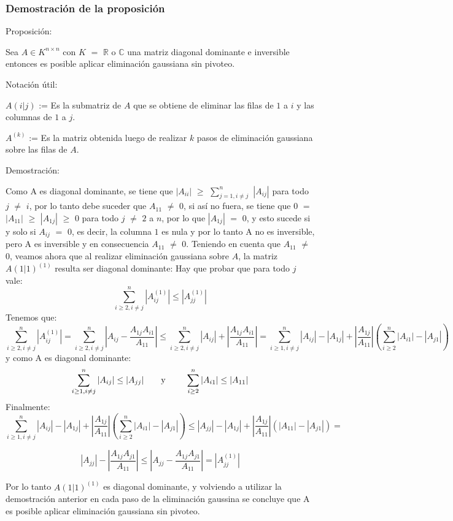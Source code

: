 \subsubsection{Demostración de la proposición}
Proposición:

Sea $A \in K^{n \times n}$ con $K$ $=$ $\mathbb{R}$ o $\mathbb{C}$ una matriz diagonal dominante e inversible entonces es posible aplicar eliminación gaussiana sin pivoteo.

Notación útil: 

$A(i|j)$ := Es la submatriz de $A$ que se obtiene de eliminar las filas de $1$ a $i$ y las columnas de $1$ a $j$.

$A^{(k)}$ := Es la matriz obtenida luego de realizar $k$ pasos de eliminación gaussiana sobre las filas de $A$.

Demostración:

Como A es diagonal dominante, se tiene que $|A_{ii}|$ $\geq$ $\sum_{j=1, i \neq j}^{n}$ $|A_{ij}|$ para todo $j$ $\neq$ $i$, por lo tanto debe suceder que $A_{11}$ $\neq$ $0$, si así no fuera, se tiene que $0$ $=$ $|A_{11}|$ $\geq$ $|A_{1j}|$  $\geq$ $0$ para todo $j$ $\neq$ $2$ a $n$, por lo que $|A_{1j}|$ $=$ $0$, y esto sucede si y solo si $A_{ij}$ $=$ $0$, es decir, la columna $1$ es nula y por lo tanto A no es inversible, pero A es inversible y en consecuencia $A_{11}$ $\neq$ $0$.
Teniendo en cuenta que $A_{11}$ $\neq$ $0$, veamos ahora que al realizar eliminación gaussiana sobre $A$, la matriz $A(1|1)^{(1)}$ resulta ser diagonal dominante:
Hay que probar que para todo $j$ vale:
\[
\sum_{i \geq 2, i \neq j}^{n}|A_{ij}^{(1)}| \leq  |A_{jj}^{(1)}| 
\]
Tenemos que:
\[
\sum_{i \geq 2, i \neq j}^{n} |A_{ij}^{(1)}| =  \sum_{i \geq 2, i \neq j}^{n} |A_{ij} - \frac{A_{1j}A_{i1}}{A_{11}}| \leq 
\sum_{i \geq 2, i \neq j}^{n} |A_{ij}| + |\frac{A_{1j}A_{i1}}{A_{11}}| =
\sum_{i \geq 1, i \neq j}^{n} |A_{ij}| - |A_{1j}| + |\frac{A_{1j}}{A_{11}}|(\sum_{i \geq 2}^{n} |A_{i1}| - |A_{j1}|)
\]
y como A es diagonal dominante:
\[
\sum_{i \geq 1, i \neq j}^{n} |A_{ij}| \leq |A_{jj}| \text{\qquad y \qquad} \sum_{i \geq 2}^{n} |A_{i1}| \leq |A_{11}|
\]
Finalmente:
\[
\sum_{i \geq 1, i \neq j}^{n} |A_{ij}| - |A_{1j}| + |\frac{A_{1j}}{A_{11}}|(\sum_{i \geq 2}^{n} |A_{i1}| - |A_{j1}|) \leq
|A_{jj}| - |A_{1j}| + |\frac{A_{1j}}{A_{11}}|(|A_{11}| - |A_{j1}|) =
\]

\[
|A_{jj}| - |\frac{A_{1j}A_{j1}}{A_{11}}| \leq
|A_{jj} - \frac{A_{1j}A_{j1}}{A_{11}}| = |A_{jj}^{(1)}|
\]

Por lo tanto $A(1|1)^{(1)}$ es diagonal dominante, y volviendo a utilizar la demostración anterior en cada paso de la eliminación gaussina se concluye que A es posible aplicar eliminación gaussiana sin pivoteo.

